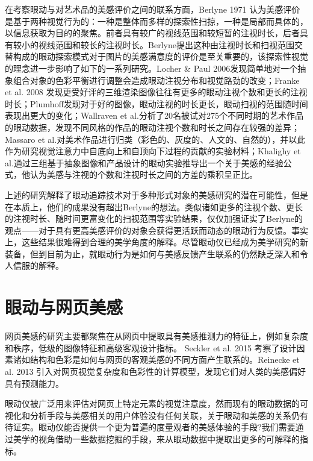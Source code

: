 在考察眼动与对艺术品的美感评价之间的联系方面，Berlyne 1971 认为美感评价是基于两种视觉行为的：一种是整体而多样的探索性扫掠，一种是局部而具体的，以信息获取为目的的聚焦\cite{Berlyne1971}。前者具有较广的视线范围和较短暂的注视时长，后者具有较小的视线范围和较长的注视时长。Berlyne提出这种由注视时长和扫视范围交替构成的眼动探索模式对于图片的美感满意度的评价是至关重要的，该探索性视觉的理念进一步影响了如下的一系列研究。Locher \& Paul 2006发现简单地对一个抽象组合对象的色彩平衡进行调整会造成眼动注视分布和视觉路劲的改变\cite{Locher2006}；Franke et al. 2008 发现更受好评的三维渲染图像往往有更多的眼动注视个数和更长的注视时长\cite{Franke2008}；Plumhoff发现对于好的图像，眼动注视的时长更长，眼动扫视的范围随时间表现出更大的变化\cite{Plumhoff2009}；Wallraven et al.分析了20名被试对275个不同时期的艺术作品的眼动数据，发现不同风格的作品的眼动注视个数和时长之间存在较强的差异\cite{Wallraven2009}；Massaro et al.对美术作品进行归类（彩色的、灰度的、人文的、自然的），并以此作为研究视觉注意力中自底向上和自顶向下过程的贡献的实验材料\cite{Massaro}；Khalighy et al.通过三组基于抽象图像和产品设计的眼动实验推导出一个关于美感的经验公式，他认为美感与注视的个数和注视时长之间的方差的乘积呈正比\cite{Khalighy2015}。

上述的研究解释了眼动追踪技术对于多种形式对象的美感研究的潜在可能性，但是在本质上，他们的成果没有超出Berlyne的想法。类似诸如更多的注视个数、更长的注视时长、随时间更富变化的扫视范围等实验结果，仅仅加强证实了Berlyne的观点——对于具有更高美感评价的对象会获得更活跃而动态的眼动行为反馈。事实上，这些结果很难得到合理的美学角度的解释。尽管眼动仪已经成为美学研究的新装备，但到目前为止，就眼动行为是如何与美感反馈产生联系的仍然缺乏深入和令人信服的解释。


\section{眼动与网页美感}
网页美感的研究主要都聚焦在从网页中提取具有美感推测力的特征上，例如复杂度和秩序\cite{Deng2010}，低级的图像特征\cite{Zheng}和高级客观设计指标\cite{Ivory}。
Seckler et al. 2015 考察了设计因素诸如结构和色彩是如何与网页的客观美感的不同方面产生联系的\cite{Seckler2015Linking}。Reinecke et al. 2013 引入对网页视觉复杂度和色彩性的计算模型，发现它们对人类的美感偏好具有预测能力\cite{Reinecke}。

眼动仪被广泛用来评估对网页上特定元素的视觉注意度，然而现有的眼动数据的可视化和分析手段与美感相关的用户体验没有任何关联，关于眼动和美感的关系仍有待证实\cite{Santella}。眼动仪能否提供一个更为普遍的度量观者的美感体验的手段?我们需要通过美学的视角借助一些数据挖掘的手段，来从眼动数据中提取出更多的可解释的指标。


